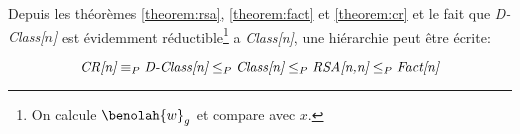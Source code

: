%
%
%
%	

	Depuis les théorèmes  \ref{theorem:rsa}, \ref{theorem:fact} et  \ref{theorem:cr} et le fait que 
	\emph{D-Class[$n$]} est évidemment réductible\footnote{On calcule $\benolah{w}_g$ et compare avec $x$.} a \emph{Class[n]},
	une hiérarchie peut être écrite: %

	$$\emph{CR[n]} \equiv_P \emph{D-Class[n]} \leq_P \emph{Class[n]} \leq_P \emph{RSA[n,n]} \leq_P \emph{Fact[n]} $$
